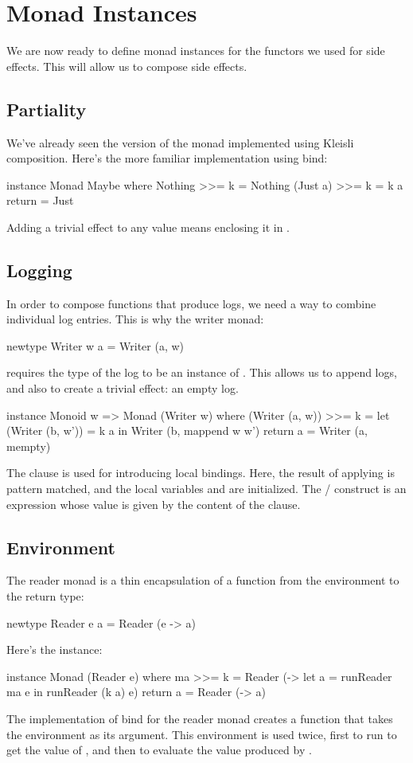 \documentclass[DaoFP]{subfiles}
\begin{document}
\section{Monad Instances}

We are now ready to define monad instances for the functors we used for side effects. This will allow us to compose side effects.

\subsection{Partiality}
We've already seen the version of the  monad implemented using Kleisli composition. Here's the more familiar implementation using bind:
\begin{haskell}
instance Monad Maybe where
  Nothing >>= k = Nothing
  (Just a) >>= k = k a
  return = Just
\end{haskell}
Adding a trivial effect to any value means enclosing it in .
\subsection{Logging}
In order to compose functions that produce logs, we need a way to combine individual log entries. This is why the writer monad:
\begin{haskell}
newtype Writer w a = Writer (a, w)
\end{haskell}
requires the type of the log to be an instance of . This allows us to append logs, and also to create a trivial effect: an empty log.
\begin{haskell}
instance Monoid w => Monad (Writer w) where
  (Writer (a, w)) >>= k = let (Writer (b, w')) = k a
                          in Writer (b, mappend w w')
  return a = Writer (a, mempty)
\end{haskell}
The  clause is used for introducing local bindings. Here, the result of applying  is pattern matched, and the local variables  and  are initialized. The / construct is an expression whose value is given by the content of the  clause.

\subsection{Environment}

The reader monad is a thin encapsulation of a function from the environment to the return type:
\begin{haskell}
newtype Reader e a = Reader (e -> a)
\end{haskell}
Here's the  instance:
\begin{haskell}
instance Monad (Reader e) where
  ma >>= k = Reader (\e -> let a = runReader ma e
                           in runReader (k a) e)
  return a = Reader (\e -> a)
\end{haskell}
The implementation of bind for the reader monad creates a function that takes the environment as its argument. This environment is used twice, first to run  to get the value of , and then to evaluate the value produced by .
\end{document}
